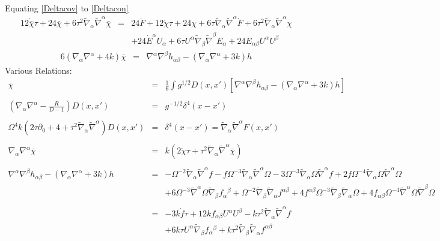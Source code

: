 \documentclass[10pt,letterpaper]{article}
\numberwithin{equation}{section}
\begin{document}
Equating \eqref{Deltacov} to \eqref{Deltacon}
\begin{eqnarray}
12  \dot{\bar \chi} \tau + 24 \bar \chi + 6 \tau^2 \tilde{\nabla}_{\alpha }\tilde{\nabla}^{\alpha }\bar \chi
&=&  24 \ddot{F} + 12 \dot{\chi} \tau + 24 \chi + 6 \tau \tilde{\nabla}_{\alpha}\tilde{\nabla}^{\alpha}\dot{F} + 6 \tau^2 \tilde{\nabla}_{\alpha}\tilde{\nabla}^{\alpha}\chi
\nonumber\\ 
&&+24 \dot{E}^{\alpha} U_{\alpha} + 6 \tau U^{\alpha} \tilde{\nabla}_{\beta}\tilde{\nabla}^{\beta}E_{\alpha}
+24 E_{\alpha \beta} U^{\alpha} U^{\beta}
\end{eqnarray}
\begin{eqnarray}
6(\nabla_\alpha \nabla^\alpha + 4k)\bar\chi &=& \nabla^\alpha\nabla^\beta h_{\alpha\beta} - (\nabla_\alpha\nabla^\alpha  + 3k) h
\end{eqnarray}
Various Relations:
\begin{eqnarray}
\bar\chi &=& \frac{1}{6}\int g^{1/2} D(x,x') \left[  \nabla^\alpha\nabla^\beta h_{\alpha\beta} - (\nabla_\alpha\nabla^\alpha  + 3k) h\right]
\\ \nonumber\\
\left(\nabla_\alpha\nabla^\alpha -\frac{R}{D-1}\right)D(x,x') &=& g^{-1/2} \delta^4(x-x')
\\ \nonumber\\
\Omega^4k ( 2  \tau \partial_0  + 4 +  \tau^2 \tilde{\nabla}_{\alpha }\tilde{\nabla}^{\alpha } )D(x,x') &=& \delta^4(x-x') = \tilde\nabla_\alpha\tilde\nabla^\alpha F(x,x') 
\\ \nonumber\\
\nabla_\alpha\nabla^\alpha \bar\chi &=& k( 
2  \dot{\chi} \tau +  \tau^2 \tilde{\nabla}_{\alpha }\tilde{\nabla}^{\alpha }\bar \chi )
\\ \nonumber\\
\nabla^\alpha\nabla^\beta h_{\alpha\beta} - (\nabla_\alpha\nabla^\alpha  + 3k) h
&=&- \Omega^{-2} \tilde{\nabla}_{\alpha }\tilde{\nabla}^{\alpha }f
-  f \Omega^{-3} \tilde{\nabla}_{\alpha }\tilde{\nabla}^{\alpha }\Omega
- 3 \Omega^{-3} \tilde{\nabla}_{\alpha }\Omega \tilde{\nabla}^{\alpha }f
+ 2 f \Omega^{-4} \tilde{\nabla}_{\alpha }\Omega \tilde{\nabla}^{\alpha }\Omega
\nonumber\\
&& + 6 \Omega^{-3} \tilde{\nabla}^{\alpha }\Omega \tilde{\nabla}_{\beta }f_{\alpha }{}^{\beta }
+ \Omega^{-2} \tilde{\nabla}_{\beta }\tilde{\nabla}_{\alpha }f^{\alpha \beta }
+ 4 f^{\alpha \beta } \Omega^{-3} \tilde{\nabla}_{\beta }\tilde{\nabla}_{\alpha }\Omega
+ 4 f_{\alpha \beta } \Omega^{-4} \tilde{\nabla}^{\alpha }\Omega \tilde{\nabla}^{\beta }\Omega
\nonumber\\ \nonumber\\
 &=&-3 k \dot{f} \tau + 12 k f_{\alpha \beta } U^{\alpha } U^{\beta } -  k \tau^2 \tilde \nabla_{\alpha }\tilde \nabla^{\alpha }f
\nonumber\\
&& + 6 k \tau U^{\alpha } \tilde\nabla_{\beta }f_{\alpha }{}^{\beta } + k \tau^2 \tilde \nabla_{\beta }\tilde \nabla_{\alpha }f^{\alpha \beta }
\end{eqnarray}

\end{document}

